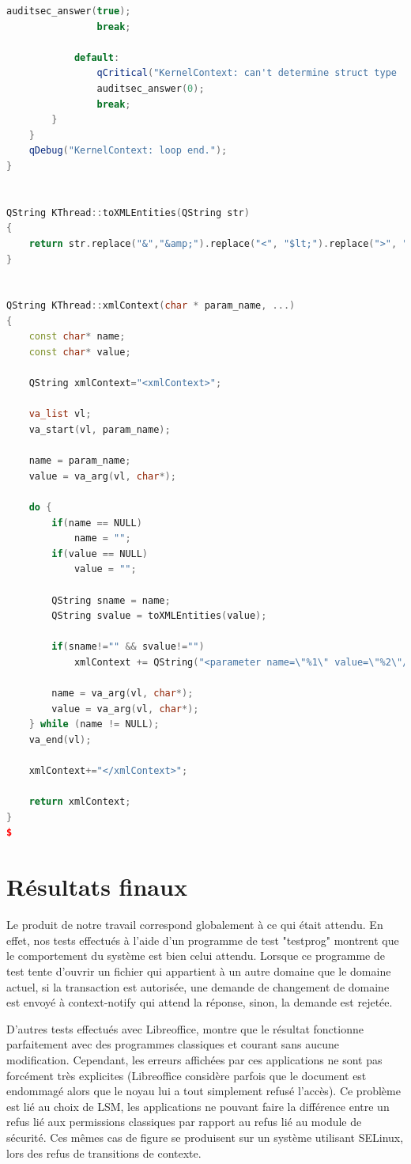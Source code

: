 \documentclass[pdftex,a4paper,titlepage,11pt]{article}
\begin{document}
\begin{lstlisting}[language=C++]
				auditsec_answer(true);
				break;

			default:
				qCritical("KernelContext: can't determine struct type !");
				auditsec_answer(0);
				break;
		}
	}
	qDebug("KernelContext: loop end.");
}


QString KThread::toXMLEntities(QString str)
{
	return str.replace("&","&amp;").replace("<", "$lt;").replace(">", "&gt;").replace("\"", "&quot;");
}


QString KThread::xmlContext(char * param_name, ...)
{
	const char* name;
	const char* value;

	QString xmlContext="<xmlContext>";

	va_list vl;
	va_start(vl, param_name);

	name = param_name;
	value = va_arg(vl, char*);

	do {
		if(name == NULL)
			name = "";
		if(value == NULL)
			value = "";

		QString sname = name;
		QString svalue = toXMLEntities(value);

		if(sname!="" && svalue!="")
			xmlContext += QString("<parameter name=\"%1\" value=\"%2\"/>").arg(sname).arg(svalue);

		name = va_arg(vl, char*);
		value = va_arg(vl, char*);
	} while (name != NULL);
	va_end(vl);

	xmlContext+="</xmlContext>";

	return xmlContext;
}
$\end{lstlisting}

\section{Résultats finaux}

Le produit de notre travail correspond globalement à ce qui était attendu. En effet, nos tests effectués à l'aide d'un programme de test "testprog" montrent que le comportement du système est bien celui attendu. Lorsque ce programme de test tente d'ouvrir un fichier qui appartient à un autre domaine que le domaine actuel, si la transaction est autorisée, une demande de changement de domaine est envoyé à context-notify qui attend la réponse, sinon, la demande est rejetée.

D'autres tests effectués avec Libreoffice, montre que le résultat fonctionne parfaitement avec des programmes classiques et courant sans aucune modification. Cependant, les erreurs affichées par ces applications ne sont pas forcément très explicites (Libreoffice considère parfois que le document est endommagé alors que le noyau lui a tout simplement refusé l'accès). Ce problème est lié au choix de LSM, les applications ne pouvant faire la différence entre un refus lié aux permissions classiques par rapport au refus lié au module de sécurité. Ces mêmes cas de figure se produisent sur un système utilisant SELinux, lors des refus de transitions de contexte.
\end{document}
